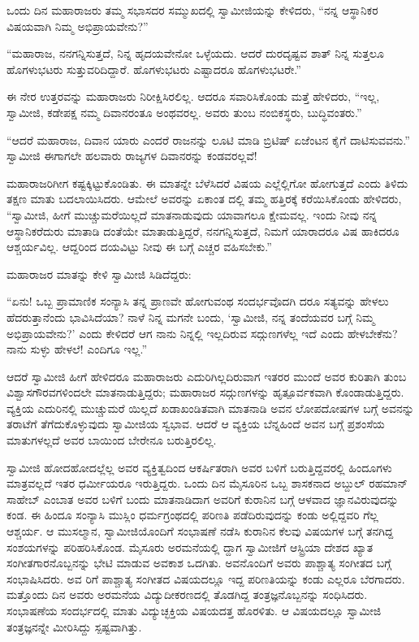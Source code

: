 ಒಂದು ದಿನ ಮಹಾರಾಜರು ತಮ್ಮ ಸಭಾಸದರ ಸಮ್ಮುಖದಲ್ಲಿ ಸ್ವಾಮೀಜಿಯನ್ನು ಕೇಳಿದರು, “ನನ್ನ ಆಸ್ಥಾನಿಕರ ವಿಷಯವಾಗಿ ನಿಮ್ಮ ಅಭಿಪ್ರಾಯವೇನು?”

“ಮಹಾರಾಜ, ನನಗನ್ನಿಸುತ್ತದೆ, ನಿನ್ನ ಹೃದಯವೇನೋ ಒಳ್ಳೆಯದು. ಆದರೆ ದುರದೃಷ್ಟವ ಶಾತ್ ನಿನ್ನ ಸುತ್ತಲೂ ಹೊಗಳುಭಟರು ಸುತ್ತುವರಿದಿದ್ದಾರೆ. ಹೊಗಳುಭಟರು ಎಷ್ಟಾದರೂ ಹೊಗಳುಭಟರೇ.”

ಈ ನೇರ ಉತ್ತರವನ್ನು ಮಹಾರಾಜರು ನಿರೀಕ್ಷಿಸಿರಲಿಲ್ಲ. ಆದರೂ ಸವಾರಿಸಿಕೊಂಡು ಮತ್ತೆ ಹೇಳಿದರು, “ಇಲ್ಲ, ಸ್ವಾಮೀಜಿ, ಕಡೇಪಕ್ಷ ನಮ್ಮ ದಿವಾನರಂತೂ ಅಂಥವರಲ್ಲ. ಅವರು ತುಂಬ ನಂಬಿಕಸ್ಥರು, ಬುದ್ಧಿವಂತರು.”

“ಆದರೆ ಮಹಾರಾಜ, ದಿವಾನ ಯಾರು ಎಂದರೆ ರಾಜನನ್ನು ಲೂಟಿ ಮಾಡಿ ಬ್ರಿಟಿಷ್ ಏಜೆಂಟನ ಕೈಗೆ ದಾಟಿಸುವವನು.” ಸ್ವಾಮೀಜಿ ಈಗಾಗಲೇ ಹಲವಾರು ರಾಜ್ಯಗಳ ದಿವಾನರನ್ನು ಕಂಡವರಲ್ಲವೆ!

ಮಹಾರಾಜರಿಗೀಗ ಕಷ್ಟಕ್ಕಿಟ್ಟುಕೊಂಡಿತು. ಈ ಮಾತನ್ನೇ ಬೆಳೆಸಿದರೆ ವಿಷಯ ಎಲ್ಲೆಲ್ಲಿಗೋ ಹೋಗುತ್ತದೆ ಎಂದು ತಿಳಿದು ತಕ್ಷಣ ಮಾತು ಬದಲಾಯಿಸಿದರು. ಆಮೇಲೆ ಅವರನ್ನು ಏಕಾಂತ ದಲ್ಲಿ ತಮ್ಮ ಹತ್ತಿರಕ್ಕೆ ಕರೆಯಿಸಿಕೊಂಡು ಹೇಳಿದರು, “ಸ್ವಾಮೀಜಿ, ಹೀಗೆ ಮುಚ್ಚುಮರೆಯಿಲ್ಲದೆ ಮಾತನಾಡುವುದು ಯಾವಾಗಲೂ ಕ್ಷೇಮವಲ್ಲ. ಇಂದು ನೀವು ನನ್ನ ಆಸ್ಥಾನಿಕರೆದುರು ಮಾತಾಡಿ ದಂತೆಯೇ ಮಾತಾಡುತ್ತಿದ್ದರೆ, ನನಗನ್ನಿಸುತ್ತದೆ, ನಿಮಗೆ ಯಾರಾದರೂ ವಿಷ ಹಾಕಿದರೂ ಆಶ್ಚರ್ಯವಿಲ್ಲ. ಆದ್ದರಿಂದ ದಯವಿಟ್ಟು ನೀವು ಈ ಬಗ್ಗೆ ಎಚ್ಚರ ವಹಿಸಬೇಕು.”

ಮಹಾರಾಜರ ಮಾತನ್ನು ಕೇಳಿ ಸ್ವಾಮೀಜಿ ಸಿಡಿದೆದ್ದರು:

“ಏನು! ಒಬ್ಬ ಪ್ರಾಮಾಣಿಕ ಸಂನ್ಯಾಸಿ ತನ್ನ ಪ್ರಾಣವೇ ಹೋಗುವಂಥ ಸಂದರ್ಭವೊದಗಿ ದರೂ ಸತ್ಯವನ್ನು ಹೇಳಲು ಹೆದರುತ್ತಾನೆಂದು ಭಾವಿಸಿದೆಯಾ? ನಾಳೆ ನಿನ್ನ ಮಗನೇ ಬಂದು, ‘ಸ್ವಾಮೀಜಿ, ನನ್ನ ತಂದೆಯವರ ಬಗ್ಗೆ ನಿಮ್ಮ ಅಭಿಪ್ರಾಯವೇನು?’ ಎಂದು ಕೇಳಿದರೆ ಆಗ ನಾನು ನಿನ್ನಲ್ಲಿ ಇಲ್ಲದಿರುವ ಸದ್ಗುಣಗಳೆಲ್ಲ ಇದೆ ಎಂದು ಹೇಳಬೇಕೆನು? ನಾನು ಸುಳ್ಳು ಹೇಳಲೆ! ಎಂದಿಗೂ ಇಲ್ಲ.”

ಆದರೆ ಸ್ವಾಮೀಜಿ ಹೀಗೆ ಹೇಳಿದರೂ ಮಹಾರಾಜರು ಎದುರಿಗಿಲ್ಲದಿರುವಾಗ ಇತರರ ಮುಂದೆ ಅವರ ಕುರಿತಾಗಿ ತುಂಬ ವಿಶ್ವಾಸಗೌರವಗಳಿಂದಲೇ ಮಾತನಾಡುತ್ತಿದ್ದರು; ಮಹಾರಾಜರ ಸದ್ಗುಣಗಳನ್ನು ಹೃತ್ಪೂರ್ವಕವಾಗಿ ಕೊಂಡಾಡುತ್ತಿದ್ದರು. ವ್ಯಕ್ತಿಯ ಎದುರಿನಲ್ಲಿ ಮುಚ್ಚುಮರೆ ಯಿಲ್ಲದೆ ಖಡಾಖಂಡಿತವಾಗಿ ಮಾತನಾಡಿ ಅವನ ಲೋಪದೋಷಗಳ ಬಗ್ಗೆ ಅವನನ್ನು ತರಾಟೆಗೆ ತೆಗೆದುಕೊಳ್ಳುವುದು ಸ್ವಾಮೀಜಿಯ ಸ್ವಭಾವ. ಆದರೆ ಆ ವ್ಯಕ್ತಿಯ ಬೆನ್ನಹಿಂದೆ ಅವನ ಬಗ್ಗೆ ಪ್ರಶಂಸೆಯ ಮಾತುಗಳಲ್ಲದೆ ಅವರ ಬಾಯಿಂದ ಬೇರೇನೂ ಬರುತ್ತಿರಲಿಲ್ಲ.

ಸ್ವಾಮೀಜಿ ಹೋದಹೋದಲ್ಲೆಲ್ಲ ಅವರ ವ್ಯಕ್ತಿತ್ವದಿಂದ ಆಕರ್ಷಿತರಾಗಿ ಅವರ ಬಳಿಗೆ ಬರುತ್ತಿದ್ದವರಲ್ಲಿ ಹಿಂದೂಗಳು ಮಾತ್ರವಲ್ಲದೆ ಇತರ ಧರ್ಮೀಯರೂ ಇರುತ್ತಿದ್ದರು. ಒಂದು ದಿನ ಮೈಸೂರಿನ ಒಬ್ಬ ಶಾಸಕನಾದ ಅಬ್ದುಲ್ ರಹಮಾನ್ ಸಾಹೇಬ್ ಎಂಬಾತ ಅವರ ಬಳಿಗೆ ಬಂದು ಮಾತನಾಡಿದಾಗ ಅವರಿಗೆ ಕುರಾನಿನ ಬಗ್ಗೆ ಆಳವಾದ ಜ್ಞಾನವಿರುವುದನ್ನು ಕಂಡ. ಈ ಹಿಂದೂ ಸಂನ್ಯಾಸಿ ಮುಸ್ಲಿಂ ಧರ್ಮಗ್ರಂಥದಲ್ಲಿ ಪರಿಣತಿ ಪಡೆದಿರುವುದನ್ನು ಕಂಡು ಅಲ್ಲಿದ್ದವರಿ ಗೆಲ್ಲ ಆಶ್ಚರ್ಯ. ಆ ಮುಸಲ್ಮಾನ, ಸ್ವಾಮೀಜಿಯೊಂದಿಗೆ ಸಂಭಾಷಣೆ ನಡೆಸಿ ಕುರಾನಿನ ಕೆಲವು ವಿಷಯಗಳ ಬಗ್ಗೆ ತನಗಿದ್ದ ಸಂಶಯಗಳನ್ನು ಪರಿಹರಿಸಿಕೊಂಡ. ಮೈಸೂರು ಅರಮನೆಯಲ್ಲಿ ದ್ದಾಗ ಸ್ವಾಮೀಜಿಗೆ ಆಸ್ಟ್ರಿಯಾ ದೇಶದ ಖ್ಯಾತ ಸಂಗೀತಗಾರನೊಬ್ಬನನ್ನು ಭೇಟಿ ಮಾಡುವ ಅವಕಾಶ ಒದಗಿತು. ಅವನೊಂದಿಗೆ ಅವರು ಪಾಶ್ಚಾತ್ಯ ಸಂಗೀತದ ಬಗ್ಗೆ ಸಂಭಾಷಿಸಿದರು. ಅವ ರಿಗೆ ಪಾಶ್ಚಾತ್ಯ ಸಂಗೀತದ ವಿಷಯದಲ್ಲೂ ಇದ್ದ ಪರಿಣತಿಯನ್ನು ಕಂಡು ಎಲ್ಲರೂ ಬೆರಗಾದರು. ಮತ್ತೊಂದು ದಿನ ಅವರು ಅರಮನೆಯ ವಿದ್ಯುದೀಕರಣದಲ್ಲಿ ತೊಡಗಿದ್ದ ತಂತ್ರಜ್ಞನೊಬ್ಬನನ್ನು ಸಂಧಿಸಿದರು. ಸಂಭಾಷಣೆಯ ಸಂದರ್ಭದಲ್ಲಿ ಮಾತು ವಿದ್ಯುಚ್ಛಕ್ತಿಯ ವಿಷಯದತ್ತ ಹೊರಳಿತು. ಆ ವಿಷಯದಲ್ಲೂ ಸ್ವಾಮೀಜಿ ತಂತ್ರಜ್ಞನನ್ನೇ ಮೀರಿಸಿದ್ದು ಸ್ಪಷ್ಟವಾಗಿತ್ತು.

